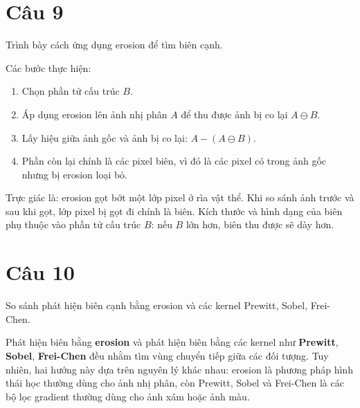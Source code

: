 \section*{Câu 9}
Trình bày cách ứng dụng erosion để tìm biên cạnh.

Các bước thực hiện:

\begin{enumerate}
    \item Chọn phần tử cấu trúc $B$.

    \item Áp dụng erosion lên ảnh nhị phân $A$ để thu được ảnh bị co lại $A\ominus B$.

    \item Lấy hiệu giữa ảnh gốc và ảnh bị co lại: $A - (A\ominus B)$.

    \item Phần còn lại chính là các pixel biên, vì đó là các pixel có trong ảnh gốc nhưng bị erosion loại bỏ.
\end{enumerate}

Trực giác là: erosion gọt bớt một lớp pixel ở rìa vật thể. Khi so sánh ảnh trước và sau khi gọt, lớp pixel bị gọt đi chính là biên. Kích thước và hình dạng của biên phụ thuộc vào phần tử cấu trúc $B$: nếu $B$ lớn hơn, biên thu được sẽ dày hơn.

\section*{Câu 10}
So sánh phát hiện biên cạnh bằng erosion và các kernel Prewitt, Sobel, Frei-Chen.

Phát hiện biên bằng \textbf{erosion} và phát hiện biên bằng các kernel như \textbf{Prewitt}, \textbf{Sobel}, \textbf{Frei-Chen} đều nhằm tìm vùng chuyển tiếp giữa các đối tượng. Tuy nhiên, hai hướng này dựa trên nguyên lý khác nhau: erosion là phương pháp hình thái học thường dùng cho ảnh nhị phân, còn Prewitt, Sobel và Frei-Chen là các bộ lọc gradient thường dùng cho ảnh xám hoặc ảnh màu.

